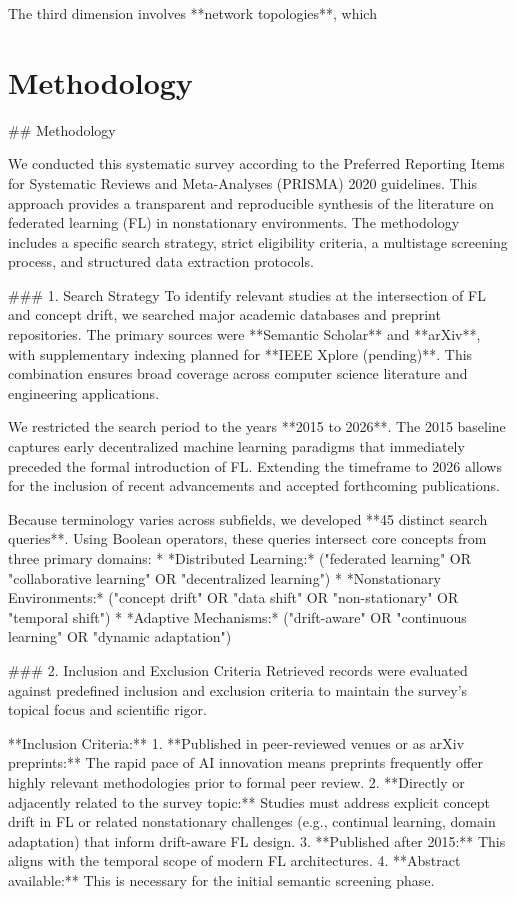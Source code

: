 \documentclass[journal]{IEEEtran}
\begin{document}
The third dimension involves **network topologies**, which

\section{Methodology}
\label{sec:methodology}

\#\# Methodology

We conducted this systematic survey according to the Preferred Reporting Items for Systematic Reviews and Meta-Analyses (PRISMA) 2020 guidelines. This approach provides a transparent and reproducible synthesis of the literature on federated learning (FL) in nonstationary environments. The methodology includes a specific search strategy, strict eligibility criteria, a multistage screening process, and structured data extraction protocols.

\#\#\# 1. Search Strategy
To identify relevant studies at the intersection of FL and concept drift, we searched major academic databases and preprint repositories. The primary sources were **Semantic Scholar** and **arXiv**, with supplementary indexing planned for **IEEE Xplore (pending)**. This combination ensures broad coverage across computer science literature and engineering applications.

We restricted the search period to the years **2015 to 2026**. The 2015 baseline captures early decentralized machine learning paradigms that immediately preceded the formal introduction of FL. Extending the timeframe to 2026 allows for the inclusion of recent advancements and accepted forthcoming publications.

Because terminology varies across subfields, we developed **45 distinct search queries**. Using Boolean operators, these queries intersect core concepts from three primary domains: 
*   *Distributed Learning:* ("federated learning" OR "collaborative learning" OR "decentralized learning")
*   *Nonstationary Environments:* ("concept drift" OR "data shift" OR "non-stationary" OR "temporal shift")
*   *Adaptive Mechanisms:* ("drift-aware" OR "continuous learning" OR "dynamic adaptation")

\#\#\# 2. Inclusion and Exclusion Criteria
Retrieved records were evaluated against predefined inclusion and exclusion criteria to maintain the survey's topical focus and scientific rigor. 

**Inclusion Criteria:**
1.  **Published in peer-reviewed venues or as arXiv preprints:** The rapid pace of AI innovation means preprints frequently offer highly relevant methodologies prior to formal peer review.
2.  **Directly or adjacently related to the survey topic:** Studies must address explicit concept drift in FL or related nonstationary challenges (e.g., continual learning, domain adaptation) that inform drift-aware FL design.
3.  **Published after 2015:** This aligns with the temporal scope of modern FL architectures.
4.  **Abstract available:** This is necessary for the initial semantic screening phase.
\end{document}
